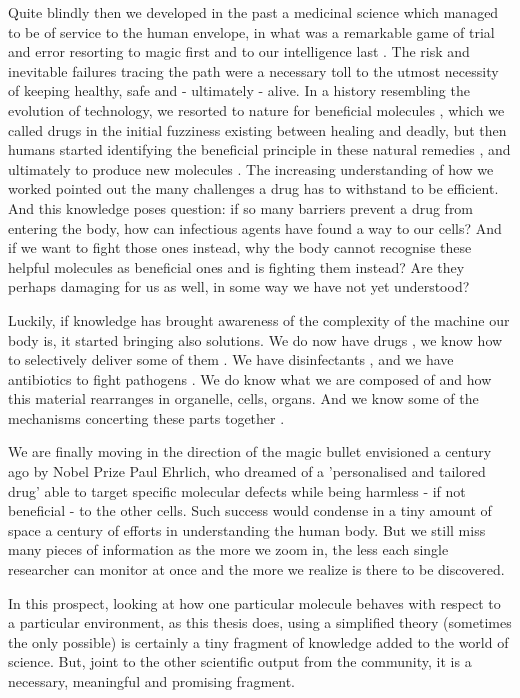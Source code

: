 \documentclass[a4paper,11pt]{extreport}
\begin{document}
Quite blindly then we developed in the past a medicinal science which managed to be of service to the human envelope, in what was a remarkable game of trial and error resorting to magic first and to our intelligence last \cite{history_medicine_review}. The risk and inevitable failures tracing the path were a necessary toll to the utmost necessity of keeping healthy, safe and - ultimately - alive. In a history resembling the evolution of technology, we resorted to nature for beneficial molecules \cite{above}, which we called drugs in the initial fuzziness existing between healing and deadly, but then humans started identifying the beneficial principle in these natural remedies \cite{other_review_early_drugs?}, and ultimately to produce new molecules \cite{other_review_early_drugs?}. The increasing understanding of how we worked pointed out the many challenges a drug has to withstand to be efficient. And this knowledge poses question: if so many barriers prevent a drug from entering the body, how can infectious agents have found a way to our cells? And if we want to fight those ones instead, why the body cannot recognise these helpful molecules as beneficial ones and is fighting them instead? Are they perhaps damaging for us as well, in some way we have not yet understood?

Luckily, if knowledge has brought awareness of the complexity of the machine our body is, it started bringing also solutions. We do now have drugs \cite{drug_database}, we know how to selectively deliver some of them \cite{review_drug_delivery}. We have disinfectants \cite{WIDES_database}, and we have antibiotics to fight pathogens \cite{ABXdatabaseJhopkins}. We do know what we are composed of \cite{Mitchess1945} and how this material rearranges in organelle, cells, organs. And we know some of the mechanisms concerting these parts together \cite{what?}.

We are finally moving in the direction of the magic bullet envisioned a century ago by Nobel Prize Paul Ehrlich, who dreamed of a 'personalised and tailored drug' able to target specific molecular defects while being harmless - if not beneficial - to the other cells.\cite{Strebhardt2008} Such success would condense in a tiny amount of space a century of efforts in understanding the human body. But we still miss many pieces of information as the more we zoom in, the less each single researcher can monitor at once and the more we realize is there to be discovered.

In this prospect, looking at how one particular molecule behaves with respect to a particular environment, as this thesis does, using a simplified theory (sometimes the only possible) is certainly a tiny fragment of knowledge added to the world of science. But, joint to the other scientific output from the community, it is a necessary, meaningful and promising fragment.
\end{document}
